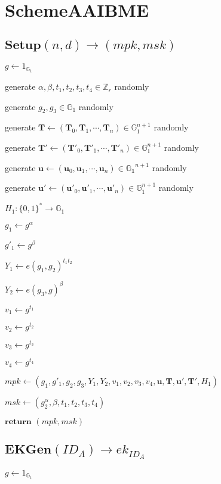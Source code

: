 \documentclass[a4paper]{article}
\begin{document}
\section{SchemeAAIBME}

\subsection{$\textbf{Setup}(n, d) \rightarrow (\textit{mpk}, \textit{msk})$}

$g \gets 1_{\mathbb{G}_1}$

generate $\alpha, \beta, t_1, t_2, t_3, t_4 \in \mathbb{Z}_r$ randomly

generate $g_2, g_3 \in \mathbb{G}_1$ randomly

generate $\bm{T} \gets (\bm{T}_0, \bm{T}_1, \cdots, \bm{T}_n) \in \mathbb{G}_1^{n + 1}$ randomly

generate $\bm{T}' \gets (\bm{T}'_0, \bm{T}'_1, \cdots, \bm{T}'_n) \in \mathbb{G}_1^{n + 1}$ randomly

generate $\bm{u} \gets (\bm{u}_0, \bm{u}_1, \cdots, \bm{u}_n) \in \mathbb{G_1}^{n + 1}$ randomly

generate $\bm{u}' \gets (\bm{u}'_0, \bm{u}'_1, \cdots, \bm{u}'_n) \in \mathbb{G}_1^{n + 1}$ randomly

$H_1: \{0, 1\}^* \rightarrow \mathbb{G}_1$

$g_1 \gets g^\alpha$

$g'_1 \gets g^\beta$

$Y_1 \gets e(g_1, g_2)^{t_1 t_2}$

$Y_2 \gets e(g_3, g)^\beta$

$v_1 \gets g^{t_1}$

$v_2 \gets g^{t_2}$

$v_3 \gets g^{t_3}$

$v_4 \gets g^{t_4}$

$ \textit{mpk} \gets (g_1, g'_1, g_2, g_3, Y_1, Y_2, v_1, v_2, v_3, v_4, \bm{u}, \bm{T}, \bm{u}', \bm{T}', H_1)$

$\textit{msk} \gets (g_2^\alpha, \beta, t_1, t_2, t_3, t_4)$

$\textbf{return }(\textit{mpk}, \textit{msk})$

\subsection{$\textbf{EKGen}(\textit{ID}_A) \rightarrow \textit{ek}_{\textit{ID}_A}$}

$g \gets 1_{\mathbb{G}_1}$
\end{document}
